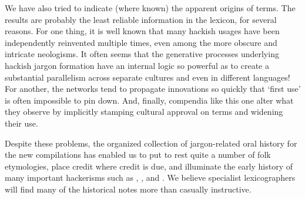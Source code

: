 We have also tried to indicate (where known) the apparent origins of terms. The results are probably the least reliable information in the
lexicon, for several reasons. For one thing, it is well known that many hackish usages have been independently reinvented multiple times,
even among the more obscure and intricate neologisms. It often seems that the generative processes underlying hackish jargon formation have
an internal logic so powerful as to create a substantial parallelism across separate cultures and even in different languages! For another,
the networks tend to propagate innovations so quickly that `first use' is often impossible to pin down. And, finally, compendia like this
one alter what they observe by implicitly stamping cultural approval on terms and widening their use.

Despite these problems, the organized collection of jargon-related oral history for the new compilations has enabled us to put to rest
quite a number of folk etymologies, place credit where credit is due, and illuminate the early history of many important hackerisms such as
, , and . We believe specialist lexicographers will find many of the historical notes more
than casually instructive.

